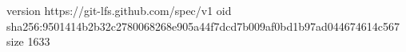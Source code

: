 version https://git-lfs.github.com/spec/v1
oid sha256:9501414b2b32c2780068268e905a44f7dcd7b009af0bd1b97ad044674614c567
size 1633
